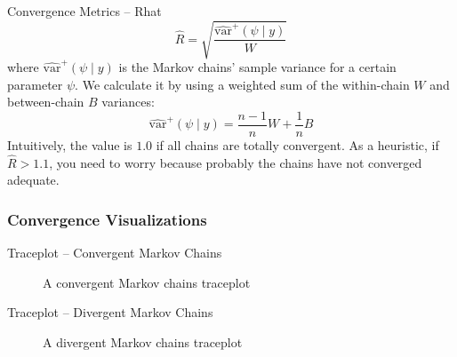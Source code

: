 \begin{frame}{Convergence Metrics -- Rhat \parencite{gelman2013bayesian}}
	$$\widehat{R} = \sqrt{\frac{\widehat{\text{var}}^+(\psi \mid y)}{W}}$$
	where $\widehat{\text{var}}^+(\psi \mid y)$ is the Markov chains' sample variance
	for a certain parameter $\psi$.
	We calculate it by using a weighted sum of the within-chain $W$
	and between-chain $B$ variances:
	$$\widehat{\text{var}}^+(\psi \mid y) = \frac{n-1}{n} W + \frac{1}{n} B$$
	\vfill
	Intuitively, the value is $1.0$ if all chains are totally convergent.
	As a heuristic, if $\widehat{R} > 1.1$,
	you need to worry because probably the chains have not converged adequate.
\end{frame}

\subsubsection{Convergence Visualizations}
\begin{frame}{Traceplot -- Convergent Markov Chains}
	\begin{figure}
		\centering
		\resizebox{.4\linewidth}{!}{}
		\caption{A convergent Markov chains traceplot}
	\end{figure}
\end{frame}

\begin{frame}{Traceplot -- Divergent Markov Chains}
	\begin{figure}
		\centering
		\resizebox{.4\linewidth}{!}{}
		\caption{A divergent Markov chains traceplot}
	\end{figure}
\end{frame}

